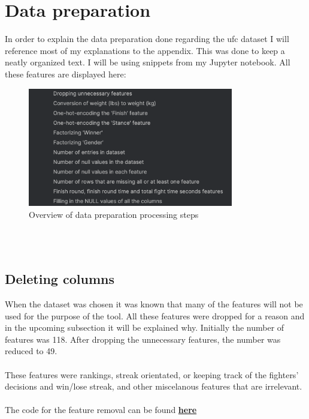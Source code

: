 \documentclass{article}
\begin{document}
  \section{Data preparation}
  In order to explain the data preparation done regarding the ufc dataset I will reference most of my explanations to the appendix. This was done to keep a neatly organized
  text. I will be using snippets from my Jupyter notebook. All these features are displayed here: \\
  \begin{figure}
    \centering
    \includegraphics[width=0.8\textwidth]{images/ToC_Data_cleaning.png}
    \caption{Overview of data preparation processing steps}
  \end{figure}\\\\

  \subsection{Deleting columns}
 
  When the dataset was chosen it was known that many of the features will not be used for the purpose of the tool. All these features were dropped for a reason and in the 
  upcoming subsection it will be explained why. Initially the number of features was 118. After dropping the unnecessary features, the number was reduced to 49.\\\\ 
  These features were rankings, streak orientated, or keeping track of the fighters' decisions and win/lose streak, and other miscelanous features that are irrelevant.\\\\ 
  The code for the feature removal can be found \href{fig:features_dropped}{\textbf{here}}
\end{document}
